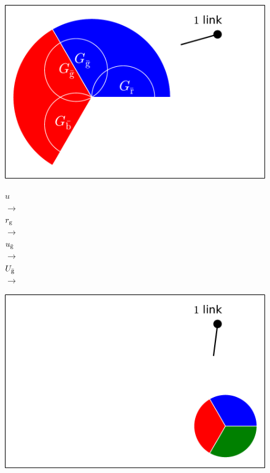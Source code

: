 \documentclass[aps, pre, onecolumn, a4paper, floatfix]{revtex4}
\begin{document}
\begin{figure}[htb]
\begin{minipage}[b]{0.3\linewidth}
\begin{center}
    \includegraphics[width=0.99\columnwidth]{sets_1_no_2_gc.pdf}\\
   \end{center}
  \end{minipage}
  \begin{minipage}[b]{0.1\linewidth}
    \begin{center}
      $u$\\
      {\huge $\longrightarrow$\\}
      \vspace{24mm}
      $r_{\rm g}$\\
      {\huge $\longrightarrow$\\}
      \vspace{24mm}
      $u_{\bar{\rm g}}$\\
      {\huge $\longrightarrow$\\}
      \vspace{24mm}
      $U_{\bar{\rm g}}$\\
      {\huge $\longrightarrow$\\}
      \vspace{15mm}
    \end{center}
  \end{minipage}
  \begin{minipage}[b]{0.3\linewidth}
    \begin{center}
    \includegraphics[width=0.99\columnwidth]{sets_1_no_gc.pdf}\\

\end{center}
\end{minipage}
\end{figure}
\end{document}
